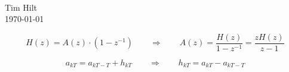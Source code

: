 \documentclass[12pt,a4paper]{scrartcl}
\begin{document}
{\\[1ex]
  Tim Hilt\\
  \today
  \par}

\tableofcontents

\[H(z) = A(z) \cdot (1 - z^{-1}) \qquad\Rightarrow\qquad A(z) = \frac{H(z)}{1 - z^{-1}} = \frac{zH(z)}{z-1}\]

\[a_{kT} = a_{kT - T} + h_{kT} \qquad\Rightarrow\qquad h_{kT} = a_{kT} - a_{kT - T}\]
\end{document}
